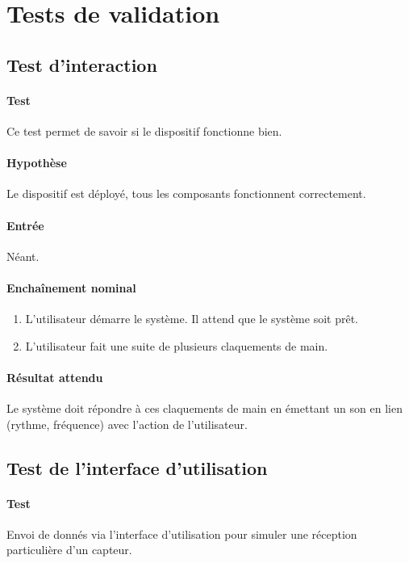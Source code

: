 \documentclass[a4paper, titlepage, oneside, 12pt]{article}%
\begin{document}
\section{Tests de validation}

\subsection{Test d'interaction}
\paragraph{Test\\}
Ce test permet de savoir si le dispositif fonctionne bien.

\paragraph{Hypothèse\\}
Le dispositif est déployé, tous les composants fonctionnent correctement.

\paragraph{Entrée\\}
Néant.

\paragraph{Enchaînement nominal}
\begin {enumerate}
\item L'utilisateur démarre le système. Il attend que le système soit prêt.
\item L'utilisateur fait une suite de plusieurs claquements de main.
\end{enumerate}

\paragraph{Résultat attendu\\}
Le système doit répondre à ces claquements de main en émettant un son en lien (rythme, fréquence) avec l'action de l'utilisateur.

\subsection{Test de l'interface d'utilisation}
\paragraph{Test\\}
Envoi de donnés via l'interface d'utilisation pour simuler une réception particulière d'un capteur.
\end{document}
